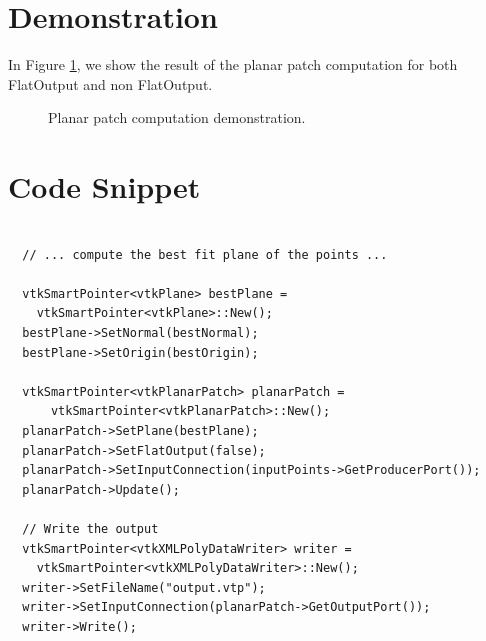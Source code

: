 \documentclass{ComputationalAlgorithmsArticle}
\begin{document}
\section{Demonstration}
In Figure \ref{fig:Demo}, we show the result of the planar patch computation for both FlatOutput and non FlatOutput.
\begin{figure}[H]
\centering
{}
\caption{Planar patch computation demonstration.}
\label{fig:Demo}
\end{figure}

\section{Code Snippet}

\begin{verbatim}

  // ... compute the best fit plane of the points ...

  vtkSmartPointer<vtkPlane> bestPlane =
    vtkSmartPointer<vtkPlane>::New();
  bestPlane->SetNormal(bestNormal);
  bestPlane->SetOrigin(bestOrigin);

  vtkSmartPointer<vtkPlanarPatch> planarPatch =
      vtkSmartPointer<vtkPlanarPatch>::New();
  planarPatch->SetPlane(bestPlane);
  planarPatch->SetFlatOutput(false);
  planarPatch->SetInputConnection(inputPoints->GetProducerPort());
  planarPatch->Update();

  // Write the output
  vtkSmartPointer<vtkXMLPolyDataWriter> writer =
    vtkSmartPointer<vtkXMLPolyDataWriter>::New();
  writer->SetFileName("output.vtp");
  writer->SetInputConnection(planarPatch->GetOutputPort());
  writer->Write();
\end{verbatim}
\end{document}
